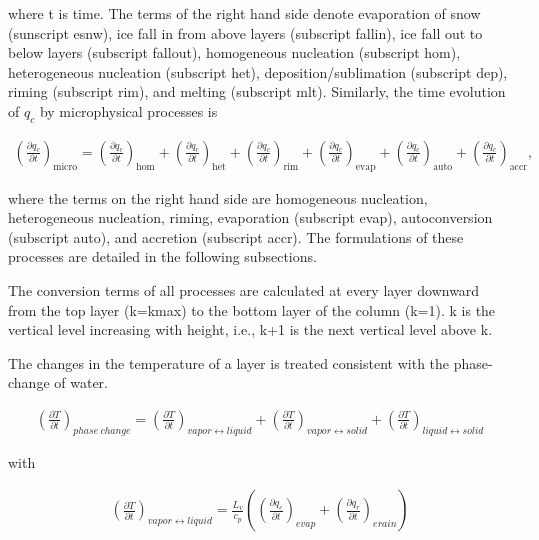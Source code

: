 where t is time. The terms of the right hand side denote evaporation of
snow (sunscript esnw), ice fall in from above layers (subscript fallin),
ice fall out to below layers (subscript fallout), homogeneous nucleation
(subscript hom), heterogeneous nucleation (subscript het),
deposition/sublimation (subscript dep), riming (subscript rim), and
melting (subscript mlt). Similarly, the time evolution of \(q_c\) by
microphysical processes is

\begin{eqnarray}
\left(\frac{\partial q_c}{\partial t}\right)_{\text {micro}}
=\left(\frac{\partial q_c}{\partial t}\right)_{\text {hom}}
+\left(\frac{\partial q_c}{\partial t}\right)_{\text {het}}
+\left(\frac{\partial q_c}{\partial t}\right)_{\text {rim}}
+\left(\frac{\partial q_c}{\partial t}\right)_{\text {evap}}
+\left(\frac{\partial q_c}{\partial t}\right)_{\text {auto}}
+\left(\frac{\partial q_c}{\partial t}\right)_{\text {accr}},
\end{eqnarray}

where the terms on the right hand side are homogeneous nucleation,
heterogeneous nucleation, riming, evaporation (subscript evap),
autoconversion (subscript auto), and accretion (subscript accr). The
formulations of these processes are detailed in the following
subsections.

The conversion terms of all processes are calculated at every layer
downward from the top layer (k=kmax) to the bottom layer of the column
(k=1). k is the vertical level increasing with height, i.e., k+1 is the
next vertical level above k.

The changes in the temperature of a layer is treated consistent with the
phase-change of water.

\begin{eqnarray}
\left(\frac{\partial T}{\partial t}\right)_{phase~change}=\left(\frac{\partial T}{\partial t}\right)_{vapor \leftrightarrow liquid}+\left(\frac{\partial T}{\partial t}\right)_{vapor \leftrightarrow solid}+\left(\frac{\partial T}{\partial t}\right)_{liquid \leftrightarrow solid}
\end{eqnarray}

with

\begin{eqnarray}
\left(\frac{\partial T}{\partial t}\right)_{vapor \leftrightarrow liquid}
=\frac{L_{v}}{c_{p}}\left(
\left(\frac{\partial q_c}{\partial t}\right)_{evap}
+\left(\frac{\partial q_r}{\partial t}\right)_{erain}
\right)
\end{eqnarray}

